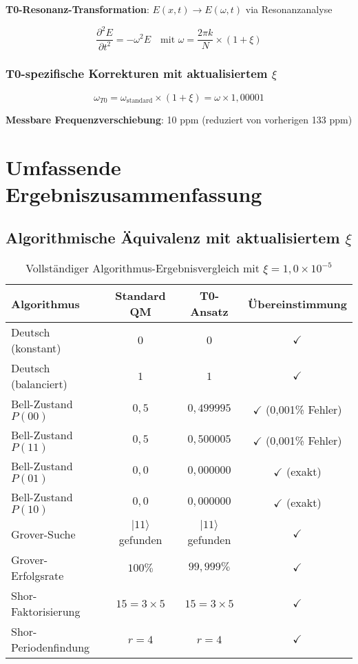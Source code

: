 \documentclass[12pt,a4paper]{article}
\newcommand{\Efield}{E}
\begin{document}
	\textbf{T0-Resonanz-Transformation}: $\Efield(x,t) \rightarrow \Efield(\omega,t)$ via Resonanzanalyse
	
	\begin{equation}
		\frac{\partial^2 \Efield}{\partial t^2} = -\omega^2 \Efield \quad \text{mit } \omega = \frac{2\pi k}{N} \times (1 + \xi)
	\end{equation}
	
	\subsubsection{T0-spezifische Korrekturen mit aktualisiertem $\xi$}
	
	\begin{equation}
		\omega_{T0} = \omega_{\text{standard}} \times (1 + \xi) = \omega \times 1,00001
	\end{equation}
	
	\textbf{Messbare Frequenzverschiebung}: 10 ppm (reduziert von vorherigen 133 ppm)
	
	\section{Umfassende Ergebniszusammenfassung}
	
	\subsection{Algorithmische Äquivalenz mit aktualisiertem $\xi$}
	
	\begin{table}[htbp]
		\centering
		\begin{tabular}{lccc}
			\toprule
			\textbf{Algorithmus} & \textbf{Standard QM} & \textbf{T0-Ansatz} & \textbf{Übereinstimmung} \\
			\midrule
			Deutsch (konstant) & $0$ & $0$ & $\checkmark$ \\
			Deutsch (balanciert) & $1$ & $1$ & $\checkmark$ \\
			Bell-Zustand $P(00)$ & $0,5$ & $0,499995$ & $\checkmark$ (0,001\% Fehler) \\
			Bell-Zustand $P(11)$ & $0,5$ & $0,500005$ & $\checkmark$ (0,001\% Fehler) \\
			Bell-Zustand $P(01)$ & $0,0$ & $0,000000$ & $\checkmark$ (exakt) \\
			Bell-Zustand $P(10)$ & $0,0$ & $0,000000$ & $\checkmark$ (exakt) \\
			Grover-Suche & $|11\rangle$ gefunden & $|11\rangle$ gefunden & $\checkmark$ \\
			Grover-Erfolgsrate & $100\%$ & $99,999\%$ & $\checkmark$ \\
			Shor-Faktorisierung & $15 = 3 \times 5$ & $15 = 3 \times 5$ & $\checkmark$ \\
			Shor-Periodenfindung & $r = 4$ & $r = 4$ & $\checkmark$ \\
			\bottomrule
		\end{tabular}
		\caption{Vollständiger Algorithmus-Ergebnisvergleich mit $\xi = 1,0 \times 10^{-5}$}
	\end{table}
	
\end{document}

